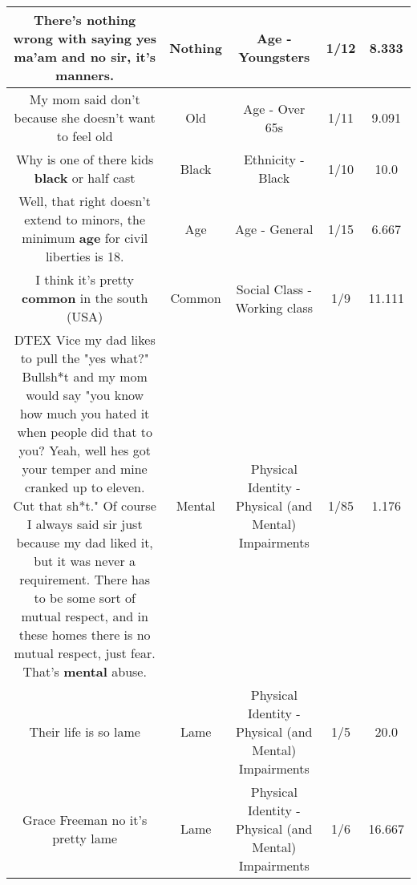 \documentclass[11pt]{article}
\newlength\mylength
\begin{document}
\begin{center}
\begin{longtable}{|C{.65\mylength}|C{.30\mylength}|C{.12\mylength}|C{.12\mylength}|C{.12\mylength}|}
  \small There's \textbf{nothing} wrong with saying yes ma'am and no sir, it's manners.\normalsize   & Nothing & Age - Youngsters & 1/12 & 8.333 \\  \hline
  \small My mom said don't because she doesn't want to feel old\normalsize   & Old & Age - Over 65s & 1/11 & 9.091 \\  \hline
  \small Why is one of there kids \textbf{black} or half cast\normalsize   & Black & Ethnicity - Black & 1/10 & 10.0 \\  \hline
  \small Well, that right doesn't extend to minors, the minimum \textbf{age} for civil liberties is 18.\normalsize   & Age & Age - General & 1/15 & 6.667 \\  \hline
  \small I think it's pretty \textbf{common} in the south (USA)\normalsize   & Common & Social Class - Working class & 1/9 & 11.111 \\  \hline
  \small DTEX Vice my dad likes to pull the "yes what?" Bullsh*t and my mom would say "you know how much you hated it when people did that to you? Yeah, well hes got your temper and mine cranked up to eleven. Cut that sh*t." Of course I always said sir just because my dad liked it, but it was never a requirement. There has to be some sort of mutual respect, and in these homes there is no mutual respect, just fear. That's \textbf{mental} abuse.\normalsize   & Mental & Physical Identity - Physical (and Mental) Impairments & 1/85 & 1.176 \\  \hline
  \small Their life is so lame\normalsize   & Lame & Physical Identity - Physical (and Mental) Impairments & 1/5 & 20.0 \\  \hline
  \small Grace Freeman no it's pretty lame\normalsize   & Lame & Physical Identity - Physical (and Mental) Impairments & 1/6 & 16.667 \\  \hline

\end{longtable}
\end{center}
\end{document}

